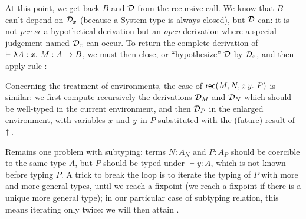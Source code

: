 \documentclass[9pt]{sigplanconf}
\begin{document}
At this point, we get back $B$ and $\mathcal D$ from the recursive call. We
know that $B$ can't depend on $\mathcal D_x$ (because a System
 type is always closed), but $\mathcal D$ can: it is not
\emph{per se} a hypothetical derivation but an \emph{open} derivation
where a special judgement named $\mathcal D_x$ can occur. To return the
complete derivation of $\vdash\lambda{\ensuremath{\text{\textit{A}}}}:{x}.\  M : A \to B$, we must then
close, or ``hypothesize'' $\mathcal D$ by $\mathcal D_x$, and then apply rule
:

\begin{mathleft}
  \quad\quad
  {}
\end{mathleft}

Concerning the treatment of environments, the case of $\text{\textsf{rec}}({M},{N},{\text{\textit{x}}}\,{\text{\textit{y}}}.\ {P})$ is similar: we first compute recursively the derivations $\mathcal D_M$
and $\mathcal D_N$ which should be well-typed in the current environment, and
then $\mathcal D_P$ in the enlarged environment, with variables $\text{\textit{x}}$ and
$\text{\textit{y}}$ in $P$ substituted with the (future) result of $\uparrow\!{}$.

Remains one problem with subtyping: terms $N : A_N$ and $P : A_P$
should be coercible to the same type $A$, but $P$ should be typed
under $\vdash y:A$, which is not known before typing $P$. A trick to
break the loop is to iterate the typing of $P$ with more and more
general types, until we reach a fixpoint (we reach a fixpoint if there
is a unique more general type); in our particular case of subtyping
relation, this means iterating only twice: we will then attain
.
\end{document}
